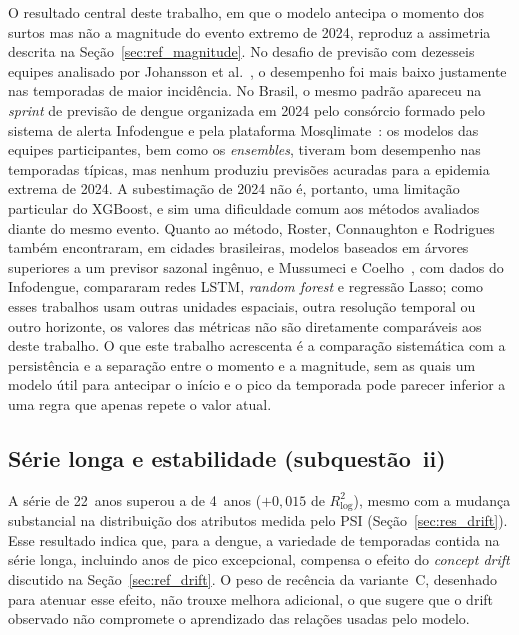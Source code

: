 O resultado central deste trabalho, em que o modelo antecipa o momento dos surtos mas não a magnitude do evento extremo de 2024, reproduz a assimetria descrita na Seção~\ref{sec:ref_magnitude}. No desafio de previsão com dezesseis equipes analisado por Johansson et al.~\cite{johansson2019open}, o desempenho foi mais baixo justamente nas temporadas de maior incidência. No Brasil, o mesmo padrão apareceu na \textit{sprint} de previsão de dengue organizada em 2024 pelo consórcio formado pelo sistema de alerta Infodengue e pela plataforma Mosqlimate~\cite{araujo2026sprint,ganem2024mosqlimate}: os modelos das equipes participantes, bem como os \textit{ensembles}, tiveram bom desempenho nas temporadas típicas, mas nenhum produziu previsões acuradas para a epidemia extrema de 2024. A subestimação de 2024 não é, portanto, uma limitação particular do XGBoost, e sim uma dificuldade comum aos métodos avaliados diante do mesmo evento. Quanto ao método, Roster, Connaughton e Rodrigues~\cite{roster2022machine} também encontraram, em cidades brasileiras, modelos baseados em árvores superiores a um previsor sazonal ingênuo, e Mussumeci e Coelho~\cite{mussumeci2020large}, com dados do Infodengue, compararam redes LSTM, \textit{random forest} e regressão Lasso; como esses trabalhos usam outras unidades espaciais, outra resolução temporal ou outro horizonte, os valores das métricas não são diretamente comparáveis aos deste trabalho. O que este trabalho acrescenta é a comparação sistemática com a persistência e a separação entre o momento e a magnitude, sem as quais um modelo útil para antecipar o início e o pico da temporada pode parecer inferior a uma regra que apenas repete o valor atual.

\subsection{Série longa e estabilidade (subquestão~ii)}

A série de 22~anos superou a de 4~anos ($+0{,}015$ de $R^2_{\log}$), mesmo com a mudança substancial na distribuição dos atributos medida pelo PSI (Seção~\ref{sec:res_drift}). Esse resultado indica que, para a dengue, a variedade de temporadas contida na série longa, incluindo anos de pico excepcional, compensa o efeito do \textit{concept drift} discutido na Seção~\ref{sec:ref_drift}. O peso de recência da variante~C, desenhado para atenuar esse efeito, não trouxe melhora adicional, o que sugere que o drift observado não compromete o aprendizado das relações usadas pelo modelo.

